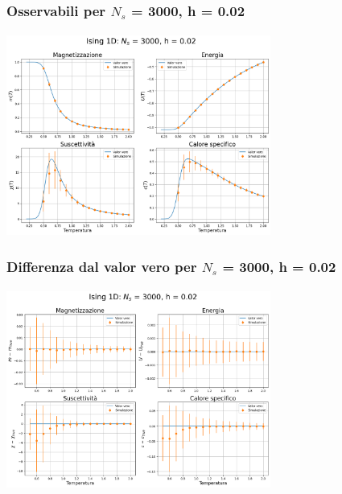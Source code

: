 \begin{frame}
    \frametitle{Osservabili per $N_s$ = 3000, h = 0.02}
    \framesubtitle{}

    \centering
    \includegraphics[width=0.65\textwidth]{Immagini/backupIsing1D/obs_3000_0.02.png}

\end{frame}



\begin{frame}
    \frametitle{Differenza dal valor vero per $N_s$ = 3000, h = 0.02}
    \framesubtitle{}

    \centering
    \includegraphics[width=0.65\textwidth]{Immagini/backupIsing1D/obs_3000_0.02_diff.png}

\end{frame}



